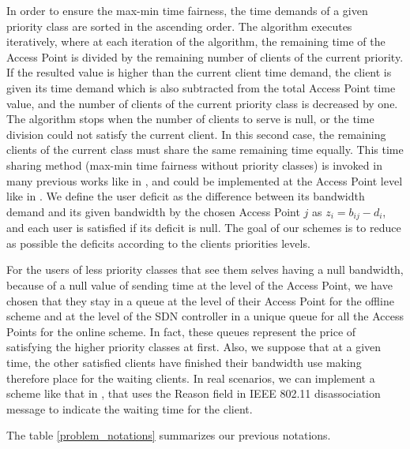 \documentclass[journal,transmag]{IEEEtran}
\begin{document}
In order to ensure the max-min time fairness, the time demands of a given priority class are sorted in the ascending order. The algorithm executes iteratively, where at each iteration of the algorithm, the remaining time of the Access Point is divided by the remaining number of clients of the current priority. If the resulted value is higher than the current client time demand, the client is given its time demand which is also subtracted from the total Access Point time value, and the number of clients of the current priority class is decreased by one. The algorithm stops when the number of clients to serve is null, or the time division could not satisfy the current client. In this second case, the remaining clients of the current class must share the same remaining time equally. This time sharing method (max-min time fairness without priority classes) is invoked in many previous works like in \cite{16throughput_optimisation_association_bandwidth,04time_based_fairness_multirate_WLAN,14AP_association_multirate_WLAN}, and could be implemented at the Access Point level like in \cite{11efficient_airtime_scheduling}.    
We define the user deficit as the difference between its bandwidth demand and its given bandwidth by the chosen Access Point $j$ as $z_i=b_{ij}-d_i$, and each user is satisfied if its deficit is null. The goal of our schemes is to reduce as possible the deficits according to the clients priorities levels.

For the users of less priority classes that see them selves having a null bandwidth, because of a null value of sending time at the level of the Access Point, we have chosen that they stay in a queue at the level of their Access Point for the offline scheme and at the level of the SDN controller in a unique queue for all the Access Points for the online scheme. In fact, these queues represent the price of satisfying the higher priority classes at first. Also, we suppose that at a given time, the other satisfied clients have finished their bandwidth use making therefore place for the waiting clients. In real scenarios, we can implement a scheme like that in \cite{06practical_queue_based_AP_association}, that uses the Reason field in IEEE 802.11 disassociation message to indicate the waiting time for the client.   

The table \ref{problem_notations} summarizes our previous notations. 
\end{document}
